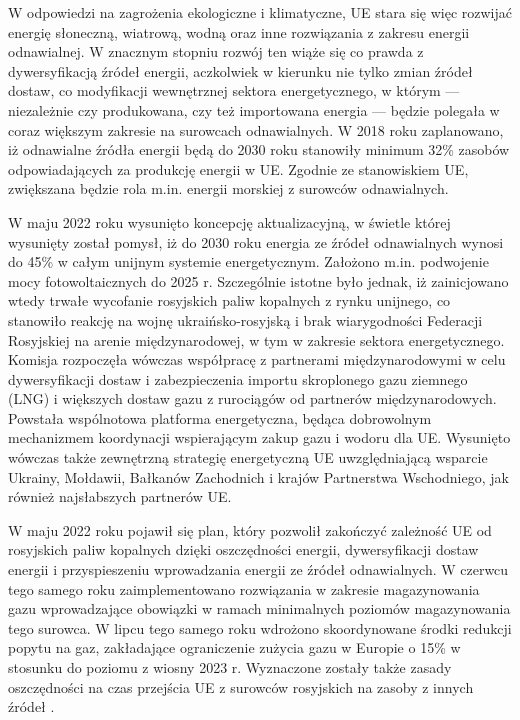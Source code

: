 \documentclass[polish, twoside, 12pt, a4paper]{article}
\theoremstyle{definition}
\theoremstyle{plain}
\theoremstyle{remark}
\begin{document}
W odpowiedzi na zagrożenia ekologiczne i klimatyczne, UE stara się więc rozwijać energię słoneczną, wiatrową, wodną oraz inne rozwiązania z zakresu energii odnawialnej. W znacznym stopniu rozwój ten wiąże się co prawda z dywersyfikacją źródeł energii, aczkolwiek w kierunku nie tylko zmian źródeł dostaw, co modyfikacji wewnętrznej sektora energetycznego, w którym --- niezależnie czy produkowana, czy też importowana energia --- będzie polegała w coraz większym zakresie na surowcach odnawialnych. W 2018 roku zaplanowano, iż odnawialne źródła energii będą do 2030 roku stanowiły minimum 32\% zasobów odpowiadających za produkcję energii w UE. Zgodnie ze stanowiskiem UE, zwiększana będzie rola m.in. energii morskiej z surowców odnawialnych. 

W maju 2022 roku wysunięto koncepcję aktualizacyjną, w świetle której wysunięty został pomysł, iż do 2030 roku energia ze źródeł odnawialnych wynosi do 45\% w całym unijnym systemie energetycznym. Założono m.in. podwojenie mocy fotowoltaicznych do 2025 r. Szczególnie istotne było jednak, iż zainicjowano wtedy trwałe wycofanie rosyjskich paliw kopalnych z rynku unijnego, co stanowiło reakcję na wojnę ukraińsko-rosyjską i brak wiarygodności Federacji Rosyjskiej na arenie międzynarodowej, w tym w zakresie sektora energetycznego. Komisja rozpoczęła wówczas współpracę z partnerami międzynarodowymi w celu dywersyfikacji dostaw i zabezpieczenia importu skroplonego gazu ziemnego (LNG) i większych dostaw gazu z rurociągów od partnerów międzynarodowych. Powstała wspólnotowa platforma energetyczna, będąca dobrowolnym mechanizmem koordynacji wspierającym zakup gazu i wodoru dla UE. Wysunięto wówczas także zewnętrzną strategię energetyczną UE uwzględniającą wsparcie Ukrainy, Mołdawii, Bałkanów Zachodnich i krajów Partnerstwa Wschodniego, jak również najsłabszych partnerów UE.

W maju 2022 roku pojawił się plan, który pozwolił zakończyć zależność UE od rosyjskich paliw kopalnych dzięki oszczędności energii, dywersyfikacji dostaw energii i przyspieszeniu wprowadzania energii ze źródeł odnawialnych. W czerwcu tego samego roku zaimplementowano rozwiązania w zakresie magazynowania gazu wprowadzające obowiązki w ramach minimalnych poziomów magazynowania tego surowca. W lipcu tego samego roku wdrożono skoordynowane środki redukcji popytu na gaz, zakładające ograniczenie zużycia gazu w Europie o 15\% w stosunku do poziomu z wiosny 2023 r. Wyznaczone zostały także zasady oszczędności na czas przejścia UE z surowców rosyjskich na zasoby z innych źródeł \parencite{ep2023}. 
\end{document}
